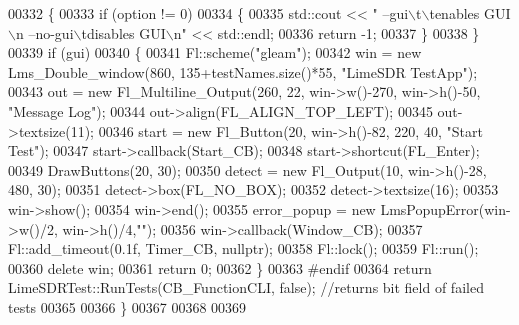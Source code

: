 \begin{DoxyCode}
00332     \{
00333         \textcolor{keywordflow}{if} (option != 0)
00334         \{
00335             std::cout << \textcolor{stringliteral}{" --gui\(\backslash\)t\(\backslash\)tenables GUI\(\backslash\)n --no-gui\(\backslash\)tdisables GUI\(\backslash\)n"} << std::endl;
00336             \textcolor{keywordflow}{return} -1;
00337         \}
00338     \}
00339     \textcolor{keywordflow}{if} (gui)
00340     \{
00341         Fl::scheme(\textcolor{stringliteral}{"gleam"});
00342         win = \textcolor{keyword}{new} Lms\_Double\_window(860, 135+testNames.size()*55, \textcolor{stringliteral}{"LimeSDR TestApp"});
00343         out = \textcolor{keyword}{new} Fl\_Multiline\_Output(260, 22, win->w()-270, win->h()-50, \textcolor{stringliteral}{"Message Log"});
00344         out->align(FL\_ALIGN\_TOP\_LEFT);
00345         out->textsize(11);
00346         start = \textcolor{keyword}{new} Fl\_Button(20, win->h()-82, 220, 40, \textcolor{stringliteral}{"Start Test"});
00347         start->callback(Start\_CB);
00348         start->shortcut(FL\_Enter);
00349         DrawButtons(20, 30);
00350         detect = \textcolor{keyword}{new} Fl\_Output(10, win->h()-28, 480, 30);
00351         detect->box(FL\_NO\_BOX);
00352         detect->textsize(16);
00353         win->show();
00354         win->end();
00355         error\_popup = \textcolor{keyword}{new} LmsPopupError(win->w()/2, win->h()/4,\textcolor{stringliteral}{""});
00356         win->callback(Window\_CB);
00357         Fl::add\_timeout(0.1f, Timer\_CB, \textcolor{keyword}{nullptr});
00358         Fl::lock();
00359         Fl::run();
00360         \textcolor{keyword}{delete} win;
00361         \textcolor{keywordflow}{return} 0;
00362     \}
00363 \textcolor{preprocessor}{#endif}
00364     \textcolor{keywordflow}{return} LimeSDRTest::RunTests(CB_FunctionCLI, \textcolor{keyword}{false}); \textcolor{comment}{//returns bit field of failed tests}
00365 
00366 \}
00367 
00368 
00369 
\end{DoxyCode}
